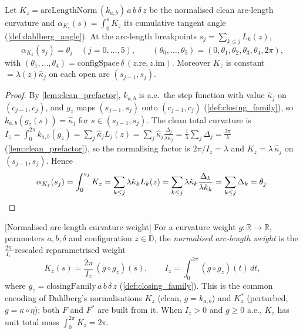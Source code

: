 \begin{lemma}

  \label{lem:clean_arclength_nodes}
  Let $K_z=\mathrm{arcLengthNorm}\,(k_{a,b})\,a\,b\,\delta\,z$ be the normalised clean
  arc-length curvature and $\alpha_{K_z}(s)=\int_0^s K_z$ its cumulative tangent
  angle (\cref{def:dahlberg_angle}). At the arc-length breakpoints
  $s_j=\sum_{k\le j}L_k(z)$,
  \[
    \alpha_{K_z}(s_j)=\theta_j\quad(j=0,\dots,5),\qquad
    (\theta_0,\dots,\theta_5)=(0,\theta_1,\theta_2,\theta_3,\theta_4,2\pi),
  \]
  with $(\theta_1,\dots,\theta_4)=\mathrm{configSpace}\,\delta\,(z.\mathrm{re},z.\mathrm{im})$.
  Moreover $K_z$ is constant $=\lambda(z)\hat\kappa_j$ on each open arc
  $(s_{j-1},s_j)$.
\end{lemma}
\begin{proof}
  \leanok
  By \cref{lem:clean_prefactor}, $k_{a,b}$ is a.e.\ the step function with
  value $\hat\kappa_j$ on $(c_{j-1},c_j)$, and $g_z$ maps $(s_{j-1},s_j)$ onto
  $(c_{j-1},c_j)$ (\cref{def:closing_family}), so $k_{a,b}(g_z(s))=\hat\kappa_j$ for
  $s\in(s_{j-1},s_j)$. The clean total curvature is
  $I_z=\int_0^{2\pi}k_{a,b}(g_z)=\sum_j\hat\kappa_j L_j(z)
   =\sum_j\hat\kappa_j\frac{\Delta_j}{\lambda\hat\kappa_j}=\frac1\lambda\sum_j\Delta_j
   =\frac{2\pi}{\lambda}$ (\cref{lem:clean_prefactor}), so the normalising factor is
  $2\pi/I_z=\lambda$ and $K_z=\lambda\,\hat\kappa_j$ on $(s_{j-1},s_j)$. Hence
  \[
    \alpha_{K_z}(s_j)=\int_0^{s_j}K_z=\sum_{k\le j}\lambda\hat\kappa_k L_k(z)
      =\sum_{k\le j}\lambda\hat\kappa_k\frac{\Delta_k}{\lambda\hat\kappa_k}
      =\sum_{k\le j}\Delta_k=\theta_j. \qedhere
  \]
\end{proof}

\begin{definition}

[Normalised arc-length curvature weight]
  \label{def:arclength_norm}
  For a curvature weight $g:\mathbb{R}\to\mathbb{R}$, parameters $a,b,\delta$ and
  configuration $z\in\overline{\mathbb{D}}$, the \emph{normalised arc-length weight}
  is the $\tfrac{2\pi}{I_z}$-rescaled reparametrised weight
  \[
    K_z(s)=\frac{2\pi}{I_z}\,(g\circ g_z)(s),\qquad
    I_z=\int_0^{2\pi}(g\circ g_z)(t)\,dt,
  \]
  where $g_z=\mathrm{closingFamily}\,a\,b\,\delta\,z$ (\cref{def:closing_family}).
  This is the common encoding of Dahlberg's normalisations $K_z$ (clean,
  $g=k_{a,b}$) and $K^*_z$ (perturbed, $g=\kappa\circ\eta$); both $F$ and $F^*$ are
  built from it. When $I_z>0$ and $g\ge 0$ a.e., $K_z$ has unit total mass
  $\int_0^{2\pi}K_z=2\pi$.
\end{definition}

